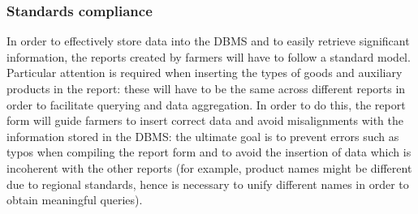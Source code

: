 \documentclass[10pt]{article}
\begin{document}
\subsubsection{Standards compliance}
In order to effectively store data into the DBMS and to easily retrieve significant information, the reports created by farmers will have to follow a standard model.
Particular attention is required when inserting the types of goods and auxiliary products in the report: these will have to be the same across different reports in order
to facilitate querying and data aggregation. In order to do this, the report form will guide farmers to insert correct data and avoid misalignments with the information stored 
in the DBMS: the ultimate goal is to prevent errors such as typos when compiling the report form and to avoid the insertion of data which is incoherent with the other reports 
(for example, product names might be different due to regional standards, hence is necessary to unify different names in order to obtain meaningful queries). 
\end{document}
